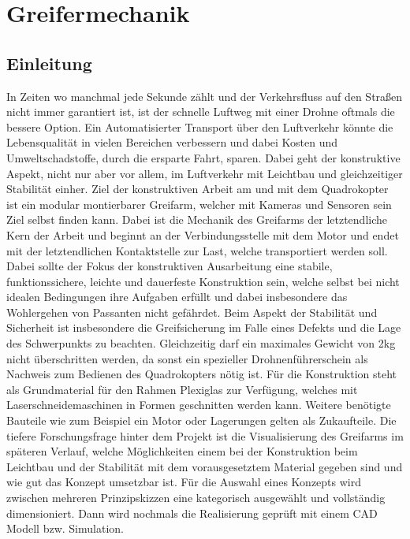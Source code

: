 \chapter{Greifermechanik}
\section{Einleitung}
In Zeiten wo manchmal jede Sekunde zählt und der Verkehrsfluss auf den Straßen
nicht immer garantiert ist, ist der schnelle Luftweg mit einer Drohne oftmals die bessere
Option. Ein Automatisierter Transport über den Luftverkehr könnte die Lebensqualität
in vielen Bereichen verbessern und dabei Kosten und Umweltschadstoffe, durch die
ersparte Fahrt, sparen. Dabei geht der konstruktive Aspekt, nicht nur aber vor allem,
im Luftverkehr mit Leichtbau und gleichzeitiger Stabilität einher.
Ziel der konstruktiven Arbeit am und mit dem Quadrokopter ist ein modular
montierbarer Greifarm, welcher mit Kameras und Sensoren sein Ziel selbst finden
kann. Dabei ist die Mechanik des Greifarms der letztendliche Kern der Arbeit und
beginnt an der Verbindungsstelle mit dem Motor und endet mit der letztendlichen
Kontaktstelle zur Last, welche transportiert werden soll.
Dabei sollte der Fokus der konstruktiven Ausarbeitung eine stabile, funktionssichere,
leichte und dauerfeste Konstruktion sein, welche selbst bei nicht idealen Bedingungen
ihre Aufgaben erfüllt und dabei insbesondere das Wohlergehen von Passanten nicht
gefährdet. Beim Aspekt der Stabilität und Sicherheit ist insbesondere die
Greifsicherung im Falle eines Defekts und die Lage des Schwerpunkts zu beachten.
Gleichzeitig darf ein maximales Gewicht von 2kg nicht überschritten werden, da sonst
ein spezieller Drohnenführerschein als Nachweis zum Bedienen des Quadrokopters
nötig ist.
Für die Konstruktion steht als Grundmaterial für den Rahmen Plexiglas zur Verfügung,
welches mit Laserschneidemaschinen in Formen geschnitten werden kann. Weitere
benötigte Bauteile wie zum Beispiel ein Motor oder Lagerungen gelten als Zukaufteile.
Die tiefere Forschungsfrage hinter dem Projekt ist die Visualisierung des Greifarms im
späteren Verlauf, welche Möglichkeiten einem bei der Konstruktion beim Leichtbau
und der Stabilität mit dem vorausgesetztem Material gegeben sind und wie gut das
Konzept umsetzbar ist.
Für die Auswahl eines Konzepts wird zwischen mehreren Prinzipskizzen eine
kategorisch ausgewählt und vollständig dimensioniert. Dann wird nochmals die
Realisierung geprüft mit einem CAD Modell bzw. Simulation. 